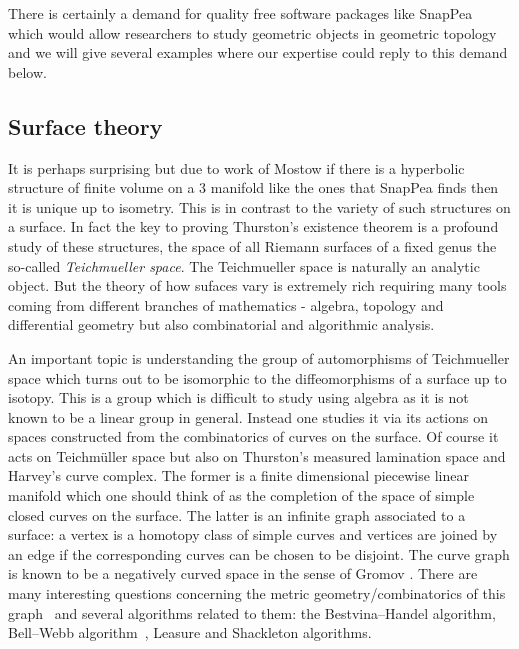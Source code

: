 \documentclass[14pt,fleqn]{article}
\begin{document}
There is certainly a demand for quality free software packages  like SnapPea  which  would allow researchers 
to study geometric objects 
in geometric topology
and 
we will give several examples 
where our expertise could 
reply to this demand below. 



\subsection{Surface theory}


It is perhaps surprising but due to work of Mostow \cite{mostow}
if there is a hyperbolic structure of finite volume on a 3 manifold like the ones that SnapPea finds 
then it is unique up to isometry.
This is in contrast 
to the variety of such structures 
on a surface.
In fact the key to proving Thurston's existence
theorem is a profound study of these 
structures, the
space of all Riemann surfaces of a fixed genus
the so-called \textit{Teichmueller space}.
The Teichmueller space is naturally an analytic object.
But the theory of
how sufaces vary is extremely rich 
requiring many tools coming
from different branches of mathematics - algebra, topology and
differential geometry but also combinatorial and algorithmic analysis.



An important topic is understanding
the group of automorphisms of 
Teichmueller space 
which turns out to be isomorphic to 
the diffeomorphisms of a surface
up to isotopy. 
This is a group which 
is difficult to study using algebra
as it is not known 
to be a linear group in general.
Instead one studies it via its actions on
spaces constructed 
from the combinatorics of curves on the surface. 
Of course  it acts on Teichm\"{u}ller space
but also on 
Thurston’s measured
lamination space \cite{FLP}
 and Harvey’s curve complex. 
The former is a finite dimensional 
piecewise linear manifold 
which one should think of 
as the completion of the space of 
simple closed curves on the surface.
The latter is an infinite
graph associated to a surface: a vertex is a homotopy class of simple
curves and vertices are joined by an edge if the corresponding curves
can be chosen to be disjoint. 
The curve graph is known to be a negatively curved 
space in the sense of Gromov \cite{MM}.
There are many interesting questions
concerning the metric geometry/combinatorics of this graph~\cite{bmm-egead-16} and several
algorithms related to them: the Bestvina–Handel algorithm, Bell–Webb
algorithm~\cite{bw-ptacg-16}, Leasure and Shackleton algorithms.
\end{document}
